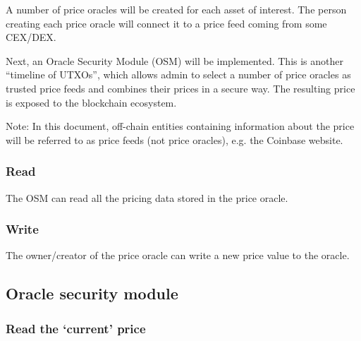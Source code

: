 \documentclass{article} %
\begin{document}
A number of price oracles will be created for each asset of interest.  The
person creating each price oracle will connect it to a price feed coming from
some CEX/DEX.

Next, an Oracle Security Module (OSM) will be implemented.
This is another ``timeline of UTXOs'', which allows admin to select a number of
price oracles as trusted price feeds and combines their prices in a secure way.
The resulting price is exposed to the blockchain ecosystem.

Note: In this document, off-chain entities containing information about the
price will be referred to as price feeds (not price oracles), e.g. the Coinbase
website.

\subsubsection{Read}

The OSM can read all the pricing data stored in the price oracle.

\subsubsection{Write}

The owner/creator of the price oracle can write a new price value to the oracle.

\subsection{Oracle security module}

\subsubsection{Read the `current' price}

\end{document}
